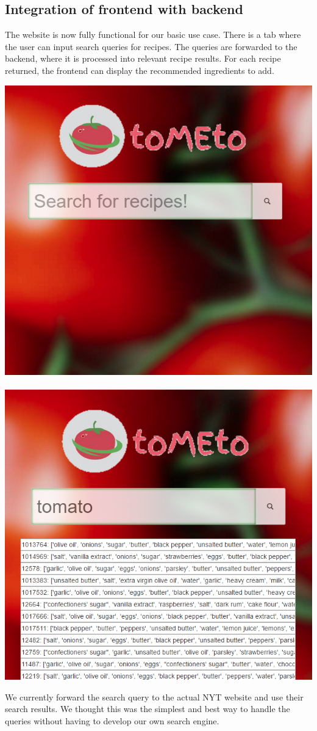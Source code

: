 \documentclass{article}
\begin{document}
\subsection{Integration of frontend with backend}
The website is now fully functional for our basic use case. There is a tab where the user can input search queries for recipes. The queries are forwarded to the backend, where it is processed into relevant recipe results. For each recipe returned, the frontend can display the recommended ingredients to add.
\begin{center}
\includegraphics[scale=0.4]{M3_img1.png}
$\quad\quad$
\includegraphics[scale=0.4]{M3_img2.png}
\end{center}
We currently forward the search query to the actual NYT website and use their search results. We thought this was the simplest and best way to handle the queries without having to develop our own search engine.
\end{document}
